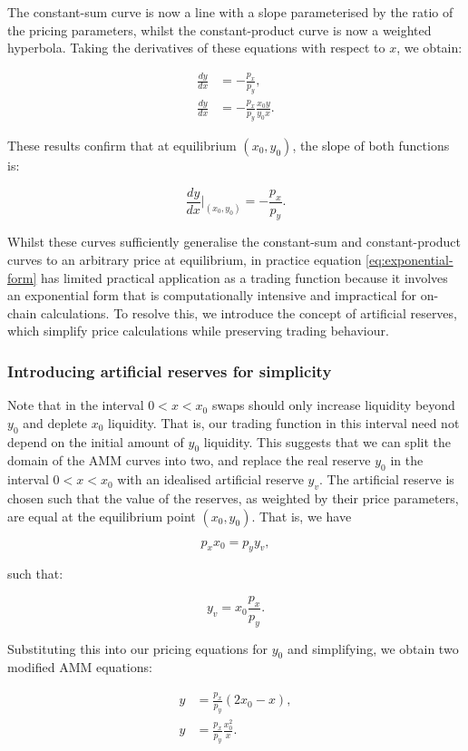 \documentclass{article}
\begin{document}
The constant-sum curve is now a line with a slope parameterised by the ratio of the pricing parameters, whilst the constant-product curve is now a weighted hyperbola. Taking the derivatives of these equations with respect to $x$, we obtain:

\begin{align}
    \frac{dy}{dx} &= -\frac{p_x}{p_y}, \\
    \frac{dy}{dx} &= -\frac{p_x}{p_y} \frac{x_0 y}{y_0 x}.
\end{align}

These results confirm that at equilibrium $(x_0, y_0)$, the slope of both functions is:

\[
\frac{dy}{dx} \Big|_{(x_0, y_0)} = -\frac{p_x}{p_y}.
\]

Whilst these curves sufficiently generalise the constant-sum and constant-product curves to an arbitrary price at equilibrium, in practice equation \eqref{eq:exponential-form} has limited practical application as a trading function because it involves an exponential form that is computationally intensive and impractical for on-chain calculations. To resolve this, we introduce the concept of artificial reserves, which simplify price calculations while preserving trading behaviour.


\subsubsection{Introducing artificial reserves for simplicity}

Note that in the interval $0 < x < x_0$ swaps should only increase liquidity beyond $y_0$ and deplete $x_0$ liquidity. That is, our trading function in this interval need not depend on the initial amount of $y_0$ liquidity. This suggests that we can split the domain of the AMM curves into two, and replace the real reserve $y_0$ in the interval $0 < x < x_0$ with an idealised artificial reserve $y_v$. The artificial reserve is chosen such that the value of the reserves, as weighted by their price parameters, are equal at the equilibrium point $(x_0, y_0)$. That is, we have

\[
p_x x_0 = p_y y_v,
\]

such that:

\[
y_v = x_0 \frac{p_x}{p_y}.
\]

Substituting this into our pricing equations for $y_0$ and simplifying, we obtain two modified AMM equations:

\begin{align}
    y &= \frac{p_x}{p_y} (2x_0 - x), \\
    y &= \frac{p_x}{p_y} \frac{x_0^2}{x}.
\end{align}
\end{document}
